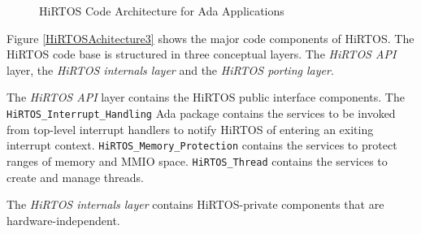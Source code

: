 \documentclass[11pt,letterpaper,twoside,openany]{book}
\begin{document}
\begin{figure}
   \begin{center}
   \end{center}
   \caption{HiRTOS Code Architecture for Ada Applications}
   \label{HiRTOSAchitecture2}
\end{figure}

Figure \ref{HiRTOSAchitecture3} shows the major code components of HiRTOS. The HiRTOS code base is
structured in three conceptual layers. The \emph{HiRTOS API} layer, the \emph{HiRTOS internals layer}
and the \emph{HiRTOS porting layer}.

The \emph{HiRTOS API} layer contains the HiRTOS public interface components.
The \verb'HiRTOS_Interrupt_Handling' Ada package contains the services to be invoked from top-level
interrupt handlers to notify HiRTOS of entering an exiting interrupt context.
\verb'HiRTOS_Memory_Protection' contains the services to protect ranges of memory and MMIO space.
\verb'HiRTOS_Thread' contains the services to create and manage threads.

The \emph{HiRTOS internals layer} contains HiRTOS-private components that are
hardware-independent.
\end{document}
